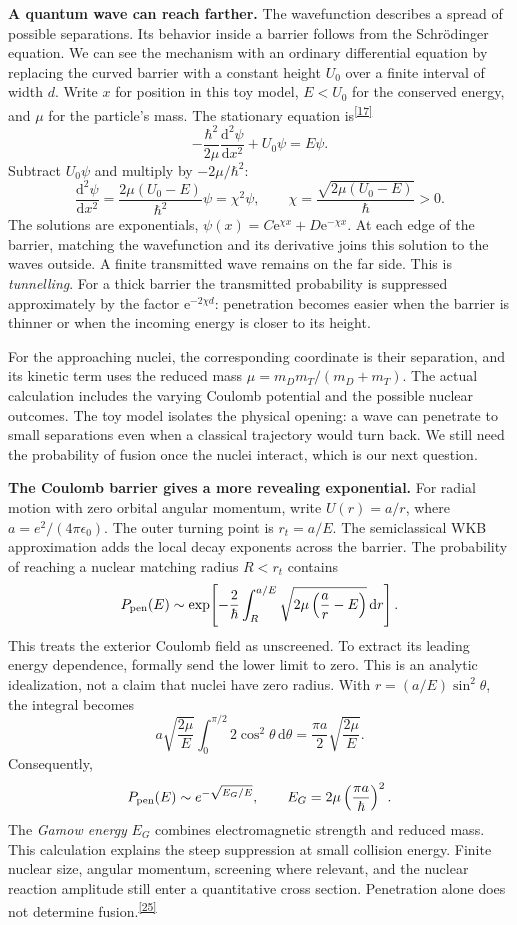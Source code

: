 \documentclass[11pt]{article}
\newcommand{\refn}[1]{\textsuperscript{\hyperlink{src#1}{[#1]}}}
\newcommand{\dd}{\mathrm d}
\newcommand{\ee}{\mathrm e}
\begin{document}
\textbf{A quantum wave can reach farther.}
The wavefunction describes a spread of possible separations. Its behavior
inside a barrier follows from the Schr\"odinger equation. We can see the
mechanism with an ordinary differential equation by replacing the curved
barrier with a constant height $U_0$ over a finite interval of width $d$.
Write $x$ for position in this toy model, $E<U_0$ for the conserved energy,
and $\mu$ for the particle's mass. The stationary equation is\refn{17}
\[
-\frac{\hbar^2}{2\mu}\frac{\dd^2\psi}{\dd x^2}+U_0\psi=E\psi.
\]
Subtract $U_0\psi$ and multiply by $-2\mu/\hbar^2$:
\[
\frac{\dd^2\psi}{\dd x^2}
=\frac{2\mu(U_0-E)}{\hbar^2}\psi
=\chi^2\psi,
\qquad \chi=\frac{\sqrt{2\mu(U_0-E)}}{\hbar}>0.
\]
The solutions are exponentials, $\psi(x)=C\ee^{\chi x}+D\ee^{-\chi x}$.
At each edge of the barrier, matching the wavefunction and its derivative
joins this solution to the waves outside. A finite transmitted wave remains
on the far side. This is \emph{tunnelling}. For a thick barrier the
transmitted probability is suppressed approximately by the factor
$\ee^{-2\chi d}$: penetration becomes easier when the barrier is thinner
or when the incoming energy is closer to its height.

For the approaching nuclei, the corresponding coordinate is their separation,
and its kinetic term uses the reduced mass
$\mu=m_Dm_T/(m_D+m_T)$. The actual calculation includes the varying Coulomb
potential and the possible nuclear outcomes. The toy model isolates the
physical opening: a wave can penetrate to small separations even when a
classical trajectory would turn back. We still need the probability of
fusion once the nuclei interact, which is our next question.

\newpage
\textbf{The Coulomb barrier gives a more revealing exponential.}
For radial motion with zero orbital angular momentum, write $U(r)=a/r$, where $a=e^2/(4\pi\epsilon_0)$. The outer turning point is $r_t=a/E$. The semiclassical WKB approximation adds the local decay exponents across the barrier. The probability of reaching a nuclear matching radius $R<r_t$ contains
\[
 P_{\rm pen}(E)\sim\exp\!\left[-\frac{2}{\hbar}
 \int_R^{a/E}\sqrt{2\mu\left(\frac ar-E\right)}\,\dd r\right].
\]
This treats the exterior Coulomb field as unscreened. To extract its leading energy dependence, formally send the lower limit to zero. This is an analytic idealization, not a claim that nuclei have zero radius. With $r=(a/E)\sin^2\theta$, the integral becomes
\[
 a\sqrt{\frac{2\mu}{E}}\int_0^{\pi/2}2\cos^2\theta\,\dd\theta
 =\frac{\pi a}{2}\sqrt{\frac{2\mu}{E}}.
\]
Consequently,
\[
 P_{\rm pen}(E)\sim e^{-\sqrt{E_G/E}},
 \qquad E_G=2\mu\left(\frac{\pi a}{\hbar}\right)^2.
\]
The \emph{Gamow energy} $E_G$ combines electromagnetic strength and reduced mass. This calculation explains the steep suppression at small collision energy. Finite nuclear size, angular momentum, screening where relevant, and the nuclear reaction amplitude still enter a quantitative cross section. Penetration alone does not determine fusion.\refn{25}
\end{document}

